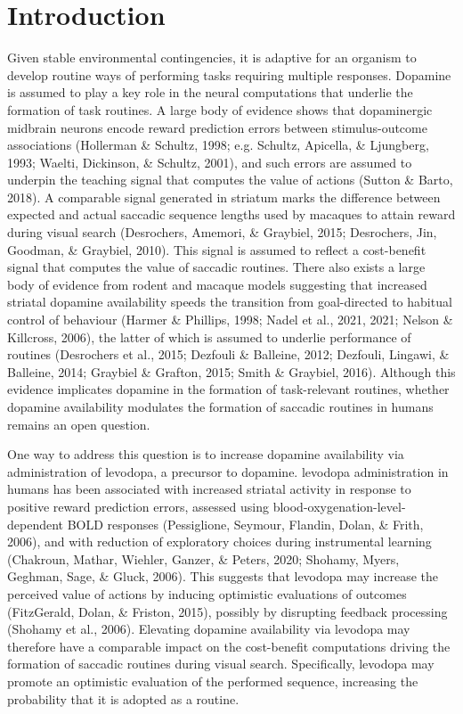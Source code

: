 \documentclass[
  man]{apa6}
\begin{document}
\clearpage

\hypertarget{introduction}{%
\section{Introduction}\label{introduction}}

\label{sec:Introduction}

Given stable environmental contingencies, it is adaptive for an organism to develop routine ways of performing tasks requiring multiple responses. Dopamine is assumed to play a key role in the neural computations that underlie the formation of task routines. A large body of evidence shows that dopaminergic midbrain neurons encode reward prediction errors between stimulus-outcome associations (Hollerman \& Schultz, 1998; e.g. Schultz, Apicella, \& Ljungberg, 1993; Waelti, Dickinson, \& Schultz, 2001), and such errors are assumed to underpin the teaching signal that computes the value of actions (Sutton \& Barto, 2018). A comparable signal generated in striatum marks the difference between expected and actual saccadic sequence lengths used by macaques to attain reward during visual search (Desrochers, Amemori, \& Graybiel, 2015; Desrochers, Jin, Goodman, \& Graybiel, 2010). This signal is assumed to reflect a cost-benefit signal that computes the value of saccadic routines. There also exists a large body of evidence from rodent and macaque models suggesting that increased striatal dopamine availability speeds the transition from goal-directed to habitual control of behaviour (Harmer \& Phillips, 1998; Nadel et al., 2021, 2021; Nelson \& Killcross, 2006), the latter of which is assumed to underlie performance of routines (Desrochers et al., 2015; Dezfouli \& Balleine, 2012; Dezfouli, Lingawi, \& Balleine, 2014; Graybiel \& Grafton, 2015; Smith \& Graybiel, 2016). Although this evidence implicates dopamine in the formation of task-relevant routines, whether dopamine availability modulates the formation of saccadic routines in humans remains an open question.

One way to address this question is to increase dopamine availability via administration of levodopa, a precursor to dopamine. levodopa administration in humans has been associated with increased striatal activity in response to positive reward prediction errors, assessed using blood-oxygenation-level-dependent BOLD responses (Pessiglione, Seymour, Flandin, Dolan, \& Frith, 2006), and with reduction of exploratory choices during instrumental learning (Chakroun, Mathar, Wiehler, Ganzer, \& Peters, 2020; Shohamy, Myers, Geghman, Sage, \& Gluck, 2006). This suggests that levodopa may increase the perceived value of actions by inducing optimistic evaluations of outcomes (FitzGerald, Dolan, \& Friston, 2015), possibly by disrupting feedback processing (Shohamy et al., 2006). Elevating dopamine availability via levodopa may therefore have a comparable impact on the cost-benefit computations driving the formation of saccadic routines during visual search. Specifically, levodopa may promote an optimistic evaluation of the performed sequence, increasing the probability that it is adopted as a routine.
\end{document}
